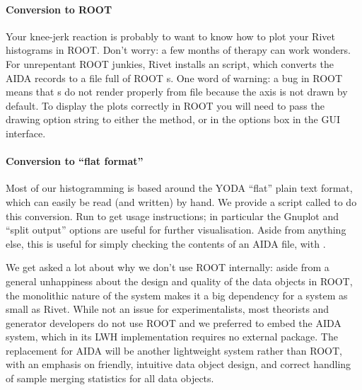 \documentclass{JHEP3}
\begin{document}
\paragraph{Conversion to ROOT}

Your knee-jerk reaction is probably to want to know how to plot your Rivet
histograms in ROOT\cite{Antcheva:2009zz}. Don't worry: a few months of therapy
can work wonders. For unrepentant ROOT junkies, Rivet installs an
 script, which converts the AIDA records to a  file
full of ROOT s. One word of warning: a bug in ROOT means that
s do not render properly from file because the axis is not drawn by
default. To display the plots correctly in ROOT you will need to pass the
 drawing option string to either the  method, or
in the options box in the  GUI interface.

\paragraph{Conversion to ``flat format''}

Most of our histogramming is based around the YODA ``flat'' plain text format,
which can easily be read (and written) by hand. We provide a script called
 to do this conversion. Run  to get usage
instructions; in particular the Gnuplot and ``split output'' options are useful
for further visualisation. Aside from anything else, this is useful for simply
checking the contents of an AIDA file, with .

\vspace{1.8em}

\begin{detail}
  We get asked a lot about why we don't use ROOT internally: aside from a
  general unhappiness about the design and quality of the data objects in ROOT,
  the monolithic nature of the system makes it a big dependency for a system as
  small as Rivet. While not an issue for experimentalists, most theorists and
  generator developers do not use ROOT and we preferred to embed the AIDA
  system, which in its LWH implementation requires no external package. The
  replacement for AIDA will be another lightweight system rather than ROOT, with
  an emphasis on friendly, intuitive data object design, and correct handling of
  sample merging statistics for all data objects.
\end{detail}
\end{document}
